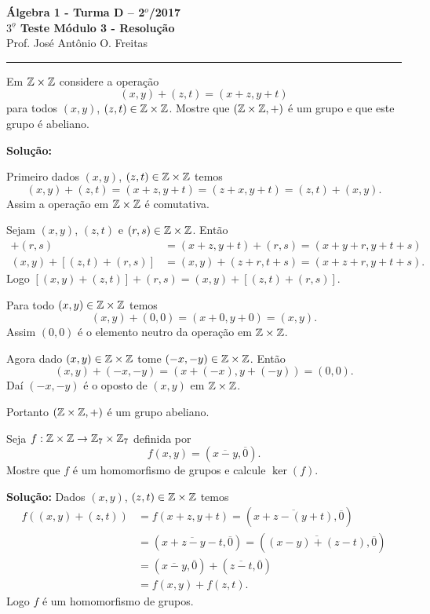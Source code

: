 \documentclass[12pt]{article}
\begin{document}


\begin{center}
{\Large\bf {\'A}lgebra 1 - Turma D -- 2$^{o}$/2017} \\ \vspace{9pt} {\large\bf
  $3^{\underline{o}}$ Teste Módulo 3 - Resolu\c{c}\~ao}\\
\vspace{9pt} Prof. Jos{\'e} Ant{\^o}nio O. Freitas
\end{center}
\hrule

\vspace{.6cm}

\questao Em $\mathbb{Z} \times\mathbb{Z}$ considere a operação
\[
	(x, y) + (z, t) = (x + z, y + t)
\]
para todos $(x,y)$, $(z,t) \in \mathbb{Z}\times\mathbb{Z}$. Mostre que $(\mathbb{Z}\times\mathbb{Z}, +)$ é um grupo e que este grupo é abeliano.

\noindent\textbf{Solu\c{c}\~ao:}

Primeiro dados $(x,y)$, $(z,t) \in \mathbb{Z}\times\mathbb{Z}$ temos
\[
	(x,y) + (z,t) = (x+z,y+t) = (z+x,y+t) = (z,t) + (x,y).
\]
Assim a operação em $\mathbb{Z}\times\mathbb{Z}$ é comutativa.

Sejam $(x,y)$, $(z,t)$ e $(r,s) \in \mathbb{Z}\times\mathbb{Z}$. Então
\begin{align*}
	[(x,y) + (z,t)] + (r,s) &= (x + z, y+t) + (r,s) = (x+y+r,y+t+s)\\
	(x,y) + [(z,t)+(r,s)] &= (x,y) + (z+r,t+s) = (x+z+r,y+t+s).
\end{align*}
Logo $[(x,y)+(z,t)] + (r,s) = (x,y) + [(z,t) + (r,s)]$.

Para todo $(x,y) \in \mathbb{Z}\times\mathbb{Z}$ temos
\[
	(x,y) + (0,0) = (x+0,y+0) = (x,y).
\]
Assim $(0,0)$ é o elemento neutro da operação em $\mathbb{Z}\times\mathbb{Z}$.

Agora dado $(x,y) \in \mathbb{Z}\times\mathbb{Z}$ tome $(-x,-y) \in \mathbb{Z}\times\mathbb{Z}$. Então
\[
	(x,y) + (-x,-y) = (x+(-x),y+(-y)) = (0,0).
\]
Daí $(-x,-y)$ é o oposto de $(x,y)$ em $\mathbb{Z}\times\mathbb{Z}$.

Portanto $(\mathbb{Z}\times\mathbb{Z},+)$ é um grupo abeliano.

\vspace{1cm}

\questao Seja $f : \mathbb{Z}\times\mathbb{Z} \to \mathbb{Z}_7\times\mathbb{Z}_7$ definida por
\[
	f(x,y) = (\overline{x-y},\overline{0}).
\]
Mostre que $f$ é um homomorfismo de grupos e calcule $\ker(f)$.

\noindent\textbf{Solu\c{c}\~ao:} Dados $(x,y)$, $(z,t) \in \mathbb{Z}\times\mathbb{Z}$ temos
\begin{align*}
	f((x,y) + (z,t)) &= f(x+z,y+t) = (\overline{x+z - (y+t)},\overline{0}) \\ &= (\overline{x+z - y - t}, \overline{0}) = (\overline{(x-y) + (z-t)},\overline{0}) \\ &= (\overline{x-y},\overline{0}) + (\overline{z-t},\overline{0}) \\ &= f(x,y) + f(z,t).
\end{align*}
Logo $f$ é um homomorfismo de grupos.
\end{document}
